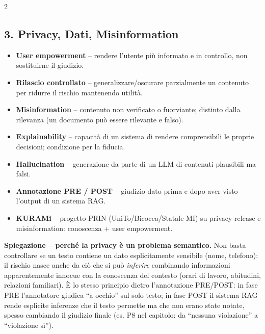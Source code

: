 \documentclass[10pt,a4paper]{extarticle}
\begin{document}
\begin{multicols}{2}
\subsection*{3. Privacy, Dati, Misinformation}
\begin{itemize}
\item \textbf{User empowerment} -- rendere l'utente pi\`u informato e in controllo, non sostituirne il giudizio.
\item \textbf{Rilascio controllato} -- generalizzare/oscurare parzialmente un contenuto per ridurre il rischio mantenendo utilit\`a.
\item \textbf{Misinformation} -- contenuto non verificato o fuorviante; distinto dalla rilevanza (un documento pu\`o essere rilevante e falso).
\item \textbf{Explainability} -- capacit\`a di un sistema di rendere comprensibili le proprie decisioni; condizione per la fiducia.
\item \textbf{Hallucination} -- generazione da parte di un LLM di contenuti plausibili ma falsi.
\item \textbf{Annotazione PRE / POST} -- giudizio dato prima e dopo aver visto l'output di un sistema RAG.
\item \textbf{KURAMi} -- progetto PRIN (UniTo/Bicocca/Statale MI) su privacy release e misinformation: conoscenza + user empowerment.
\end{itemize}
\smallskip\noindent\textbf{\textcolor{blue!45!black}{Spiegazione -- perch\'e la privacy \`e un problema semantico.}} Non basta controllare se un testo contiene un dato esplicitamente sensibile (nome, telefono): il rischio nasce anche da ci\`o che si pu\`o \emph{inferire} combinando informazioni apparentemente innocue con la conoscenza del contesto (orari di lavoro, abitudini, relazioni familiari). \`E lo stesso principio dietro l'annotazione PRE/POST: in fase PRE l'annotatore giudica ``a occhio'' sul solo testo; in fase POST il sistema RAG rende esplicite inferenze che il testo permette ma che non erano state notate, spesso cambiando il giudizio finale (es. P8 nel capitolo: da ``nessuna violazione'' a ``violazione s\`i'').


\end{multicols}
\end{document}
